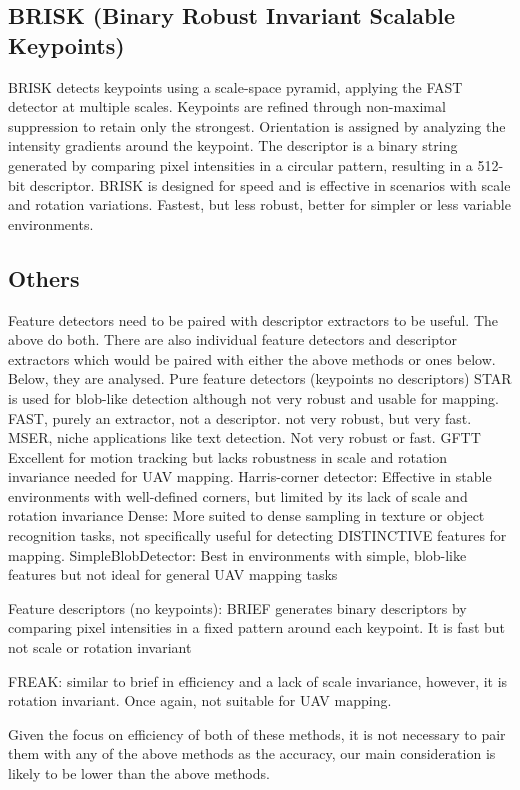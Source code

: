 \subsection*{BRISK (Binary Robust Invariant Scalable Keypoints)}
BRISK detects keypoints using a scale-space pyramid, applying the FAST detector at multiple scales. Keypoints are refined through non-maximal suppression to retain only the strongest. Orientation is assigned by analyzing the intensity gradients around the keypoint. The descriptor is a binary string generated by comparing pixel intensities in a circular pattern, resulting in a 512-bit descriptor. BRISK is designed for speed and is effective in scenarios with scale and rotation variations.
Fastest, but less robust, better for simpler or less variable environments.


\subsection*{Others}
Feature detectors need to be paired with descriptor extractors to be useful. The above do both. There are also individual feature detectors and descriptor extractors which would be paired with either the above methods or ones below. Below, they are analysed. 
Pure feature detectors (keypoints no descriptors)
STAR is used for blob-like detection although not very robust and usable for mapping. 
FAST, purely an extractor, not a descriptor. not very robust, but very fast.
MSER, niche applications like text detection. Not very robust or fast.
GFTT Excellent for motion tracking but lacks robustness in scale and rotation invariance needed for UAV mapping.
Harris-corner detector: Effective in stable environments with well-defined corners, but limited by its lack of scale and rotation invariance
Dense: More suited to dense sampling in texture or object recognition tasks, not specifically useful for detecting DISTINCTIVE features for mapping.
SimpleBlobDetector: Best in environments with simple, blob-like features but not ideal for general UAV mapping tasks


Feature descriptors (no keypoints):
BRIEF generates binary descriptors by comparing pixel intensities in a fixed pattern around each keypoint. It is fast but not scale or rotation invariant

FREAK: similar to brief in efficiency and a lack of scale invariance, however, it is rotation invariant. Once again, not suitable for UAV mapping.

Given the focus on efficiency of both of these methods, it is not necessary to pair them with any of the above methods as the accuracy, our main consideration is likely to be lower than the above methods.






